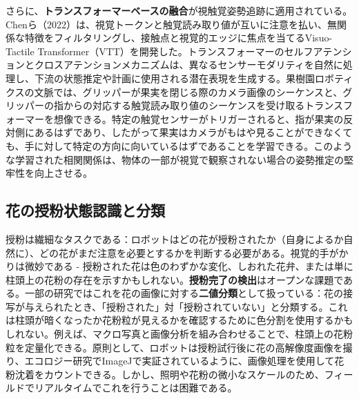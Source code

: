 \documentclass[a4paper,fleqn,10pt,twocolumn]{template_v1.0}
\begin{document}
さらに、\textbf{トランスフォーマーベースの融合}が視触覚姿勢追跡に適用されている。Chenら（2022）は、視覚トークンと触覚読み取り値が互いに注意を払い、無関係な特徴をフィルタリングし、接触点と視覚的エッジに焦点を当てるVisuo-Tactile Transformer（VTT）を開発した\cite{Chen2022}。トランスフォーマーのセルフアテンションとクロスアテンションメカニズムは、異なるセンサーモダリティを自然に処理し、下流の状態推定や計画に使用される潜在表現を生成する。果樹園ロボティクスの文脈では、グリッパーが果実を閉じる際のカメラ画像のシーケンスと、グリッパーの指からの対応する触覚読み取り値のシーケンスを受け取るトランスフォーマーを想像できる。特定の触覚センサーがトリガーされると、指が果実の反対側にあるはずであり、したがって果実はカメラがもはや見ることができなくても、手に対して特定の方向に向いているはずであることを学習できる。このような学習された相関関係は、物体の一部が視覚で観察されない場合の姿勢推定の堅牢性を向上させる。

\subsection{花の授粉状態認識と分類}
授粉は繊細なタスクである：ロボットはどの花が授粉されたか（自身によるか自然に）、どの花がまだ注意を必要とするかを判断する必要がある。視覚的手がかりは微妙である - 授粉された花は色のわずかな変化、しおれた花弁、または単に柱頭上の花粉の存在を示すかもしれない。\textbf{授粉完了の検出}はオープンな課題である。一部の研究ではこれを花の画像に対する\textbf{二値分類}として扱っている：花の接写が与えられたとき、「授粉された」対「授粉されていない」と分類する。これは柱頭が暗くなったか花粉粒が見えるかを確認するために色分割を使用するかもしれない。例えば、マクロ写真と画像分析を組み合わせることで、柱頭上の花粉粒を定量化できる\cite{MacGregor2018}。原則として、ロボットは授粉試行後に花の高解像度画像を撮り、エコロジー研究でImageJで実証されているように、画像処理を使用して花粉沈着をカウントできる\cite{MacGregor2018}。しかし、照明や花粉の微小なスケールのため、フィールドでリアルタイムでこれを行うことは困難である。
\end{document}
